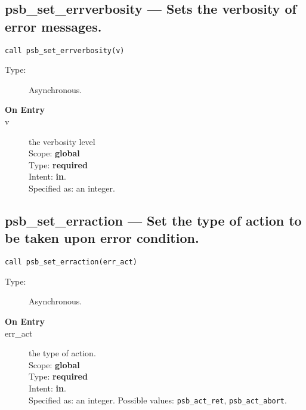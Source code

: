 \clearpage\subsection*{psb\_set\_errverbosity --- Sets the verbosity of error
  messages.}

\begin{verbatim}
call psb_set_errverbosity(v)
\end{verbatim}

\begin{description}
\item[Type:] Asynchronous.
\item[\bf On Entry]
\item[v] the verbosity level\\
Scope: {\bf global}\\
Type: {\bf required}\\
Intent: {\bf in}.\\
Specified as: an integer.
\end{description}

\clearpage\subsection*{psb\_set\_erraction --- Set the type of action to be
  taken  upon error condition.}


\begin{verbatim}
call psb_set_erraction(err_act)
\end{verbatim}

\begin{description}
\item[Type:] Asynchronous.
\item[\bf On Entry]
\item[err\_act] the type of action.\\
Scope: {\bf global} \\
Type: {\bf required}\\
Intent: {\bf in}.\\
Specified as: an integer. Possible values: \verb|psb_act_ret|,
\verb|psb_act_abort|. 
\end{description}




